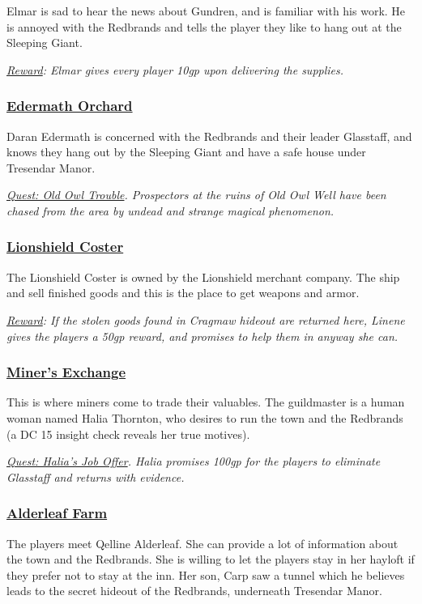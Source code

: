 Elmar is sad to hear the news about Gundren, and is familiar with his work. He is annoyed with the Redbrands and tells the player they like to hang out at the Sleeping Giant.

\emph{\underline{Reward}: Elmar gives every player 10gp upon delivering the supplies.}

\subsubsection*{\underline{Edermath Orchard}}
Daran Edermath is concerned with the Redbrands and their leader Glasstaff, and knows they hang out by the Sleeping Giant and have a safe house under Tresendar Manor.

\emph{\underline{Quest: Old Owl Trouble}. Prospectors at the ruins of Old Owl Well have been chased from the area by undead and strange magical phenomenon. }


\subsubsection*{\underline{Lionshield Coster}}
The Lionshield Coster is owned by the Lionshield merchant company. The ship and sell finished goods and this is the place to get weapons and armor. 

\emph{\underline{Reward}: If the stolen goods found in Cragmaw hideout are returned here, Linene gives the players a 50gp reward, and promises to help them in anyway she can.}

\subsubsection*{\underline{Miner's Exchange}}
This is where miners come to trade their valuables. The guildmaster is a human woman named Halia Thornton, who desires to run the town and the Redbrands (a DC 15 insight check reveals her true motives). 

\emph{\underline{Quest: Halia's Job Offer}. Halia promises 100gp for the players to eliminate Glasstaff and returns with evidence. }

\subsubsection*{\underline{Alderleaf Farm}}
The players meet Qelline Alderleaf. She can provide a lot of information about the town and the Redbrands. She is willing to let the players stay in her hayloft if they prefer not to stay at the inn. Her son, Carp saw a tunnel which he believes leads to the secret hideout of the Redbrands, underneath Tresendar Manor.

